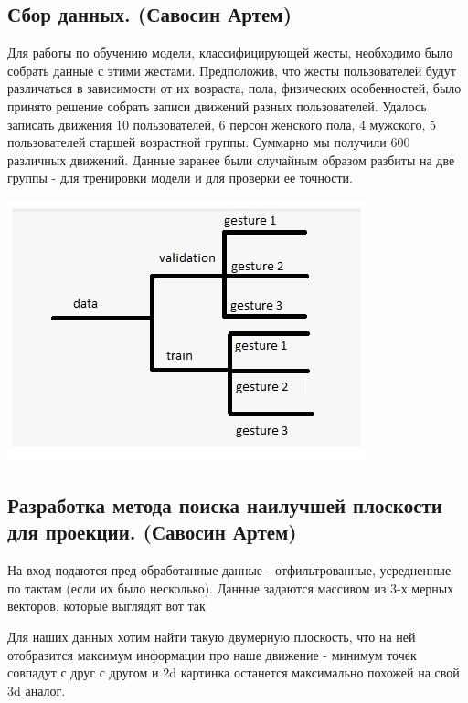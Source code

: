 \subsection{Сбор данных. (Савосин Артем)}
Для работы по обучению модели, классифицирующей жесты, необходимо было собрать данные с этими жестами. Предположив, что жесты пользователей будут различаться в зависимости от их возраста, пола, физических особенностей, было принято решение собрать записи движений разных пользователей. Удалось записать движения 10 пользователей, 6 персон женского пола, 4 мужского, 5 пользователей старшей возрастной группы.
Суммарно мы получили 600 различных движений.
Данные заранее были случайным образом разбиты на две группы - для тренировки модели и для проверки ее точности.

\includegraphics[scale = 1]{images_sav/data.png}

\subsection{Разработка метода поиска наилучшей плоскости для проекции. (Савосин Артем)}

На вход подаются пред обработанные данные - отфильтрованные, усредненные по тактам (если их было несколько). Данные задаются массивом из 3-х мерных векторов, которые выглядят вот так
\begin{figure}[H]
\end{figure}
Для наших данных хотим найти такую двумерную плоскость, что на ней отобразится максимум информации про наше движение - минимум точек совпадут с друг с другом и 2d картинка останется максимально похожей на свой 3d аналог. 

